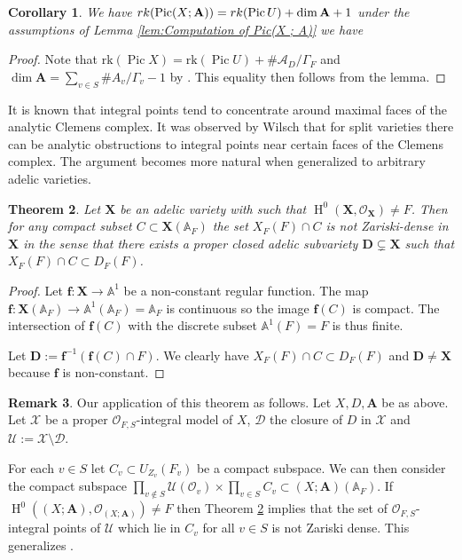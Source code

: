 \documentclass[a4paper,11pt,reqno]{amsart}
\newcommand{\A}{\mathbb{A}}
\DeclareMathOperator{\Pic}{Pic}
\DeclareMathOperator{\HH}{H}
\newtheorem{theorem}{Theorem}[section]
\newtheorem{corollary}[theorem]{Corollary}
\theoremstyle{definition}
\newtheorem{remark}[theorem]{Remark}
\begin{document}
\begin{corollary}\label{cor:Rank of Picard group Clemens complex}
	We have $\emph{rk}( \Pic(X ; \mathbf{A}))= \emph{rk}( \Pic U) + \dim \mathbf{A} + 1$ under the assumptions of Lemma \ref{lem:Computation of Pic(X ; A)} we have
\end{corollary}
\begin{proof}
	Note that $\text{rk}( \Pic X) = \text{rk}( \Pic U) + \# \mathcal{A}_D/\Gamma_F$ and $\dim \mathbf{A} = \sum_{v \in S} \# A_v / \Gamma_v - 1$ by \cite[p.~380]{Chambert-Loir2010Igusa}. This equality then follows from the lemma.
\end{proof}

It is known that integral points tend to concentrate around maximal faces of the analytic Clemens complex. It was observed by Wilsch \cite[\S 2.3]{Wilsch2022Integral} that for split varieties there can be analytic obstructions to integral points near certain faces of the Clemens complex. The argument becomes more natural when generalized to arbitrary adelic varieties.
\begin{theorem}	\label{thm: Non-constant regular functions imply failure of Zariski density}
	Let $\mathbf{X}$ be an adelic variety with such that $\HH^0(\mathbf{X}, \mathcal{O}_{\mathbf{X}}) \neq F$. Then for any compact subset $C \subset \mathbf{X}(\A_F)$ the set $X_F(F) \cap C$ is not Zariski-dense in $\mathbf{X}$ in the sense that there exists a proper closed adelic subvariety $\mathbf{D} \subsetneq \mathbf{X}$ such that $ X_F(F) \cap C \subset D_F(F)$.
\end{theorem}
\begin{proof}
	Let $\mathbf{f}:\mathbf{X} \to \A^1$ be a non-constant regular function. The map $\mathbf{f}: \mathbf{X}(\A_F) \to \A^1(\A_{F}) = \A_F$ is continuous so the image $\mathbf{f}(C)$ is compact. The intersection of $\mathbf{f}(C)$ with the discrete subset $\A^1(F) = F$ is thus finite.
	
	Let $\mathbf{D} := \mathbf{f}^{-1}(\mathbf{f}(C) \cap F)$. We clearly have $ X_F(F) \cap C \subset D_F(F)$ and $\mathbf{D} \neq \mathbf{X}$ because $\mathbf{f}$ is non-constant.
\end{proof}
\begin{remark}\label{rem:Analytic obstructions to Zariski density}
	Our application of this theorem as follows. Let $X, D, \mathbf{A}$ be as above. Let $\mathcal{X}$ be a proper $\mathcal{O}_{F,S}$-integral model of $X$, $\mathcal{D}$ the closure of $D$ in $\mathcal{X}$ and $\mathcal{U} := \mathcal{X} \setminus \mathcal{D}$. 
	
	For each $v \in S$ let $C_v \subset U_{Z_v}(F_v)$ be a compact subspace. We can then consider the compact subspace $\prod_{v \not \in S} \mathcal{U}(\mathcal{O}_v) \times \prod_{v \in S} C_v \subset (X ; \mathbf{A})(\A_F)$. If $\HH^0((X; \mathbf{A}), \mathcal{O}_{(X; \mathbf{A})}) \neq F$ then Theorem \ref{thm: Non-constant regular functions imply failure of Zariski density} implies that the set of $\mathcal{O}_{F,S}$-integral points of $\mathcal{U}$ which lie in $C_v$ for all $v \in S$ is not Zariski dense. This generalizes \cite[Prop. 3.2.1]{Wilsch2022Integral}.
\end{remark}
\end{document}
